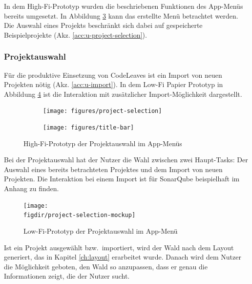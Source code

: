 In dem High-Fi-Prototyp wurden die beschriebenen Funktionen des App-Menüs bereits umgesetzt. In Abbildung \ref{fig:app-menu} kann das erstellte Menü betrachtet werden. Die Auswahl eines Projekts beschränkt sich dabei auf gespeicherte Beispielprojekte (Akz. \ref{acc:u-project-selection}).

\subsubsection*{Projektauswahl}

Für die produktive Einsetzung von CodeLeaves ist ein Import von neuen Projekten nötig (Akz. \ref{acc:u-import}). In dem Low-Fi Papier Prototyp in Abbildung \ref{fig:project-selection-mockup} ist die Interaktion mit zusätzlicher Import-Möglichkeit dargestellt.

\begin{figure}[htb]
  \centering
  \begin{subfigure}[t]{\textwidth}
    \centering
    \texttt{[image: figures/project-selection]}
     \label{fig:project-selection}
  \end{subfigure}
  \par\bigskip
  \begin{subfigure}[t]{\textwidth}
    \centering
  	\texttt{[image: figures/title-bar]}
  	 \label{fig:title-bar}
  \end{subfigure}
  \caption{High-Fi-Prototyp der Projektauswahl im App-Menüs} \label{fig:app-menu}
\end{figure}

Bei der Projektauswahl hat der Nutzer die Wahl zwischen zwei Haupt-Tasks: Der Auswahl eines bereits betrachteten Projektes und dem Import von neuen Projekten. Die Interaktion bei einem Import ist für SonarQube beispielhaft im Anhang zu finden.

\begin{figure}[htb]
  \texttt{[image: \\figdir/project-selection-mockup]}
  \caption{Low-Fi-Prototyp der Projektauswahl im App-Menü}
  \label{fig:project-selection-mockup}
\end{figure}

Ist ein Projekt ausgewählt bzw.\ importiert, wird der Wald nach dem Layout generiert, das in Kapitel \ref{ch:layout} erarbeitet wurde. Danach wird dem Nutzer die Möglichkeit geboten, den Wald so anzupassen, dass er genau die Informationen zeigt, die der Nutzer sucht.

